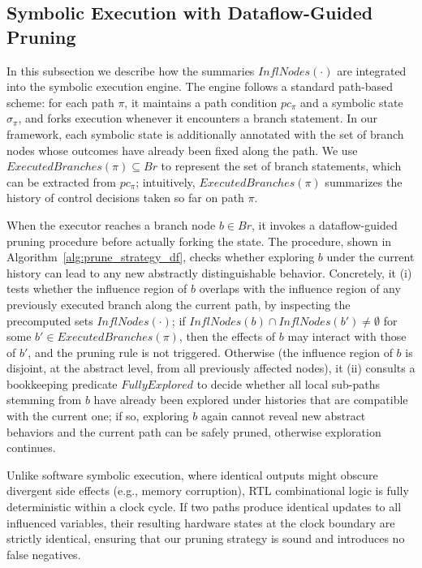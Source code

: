\documentclass[conference]{IEEEtran}
\begin{document}
\subsection{Symbolic Execution with Dataflow-Guided Pruning}
\label{subsec:symex-pruning}
In this subsection we describe how the summaries $InflNodes(\cdot)$ are integrated into the symbolic execution engine. The engine follows a standard path-based scheme: for each path $\pi$, it maintains a path condition $pc_\pi$ and a symbolic state $\sigma_\pi$, and forks execution whenever it encounters a branch statement. In our framework, each symbolic state is additionally annotated with the set of branch nodes whose outcomes have already been fixed along the path. We use $ExecutedBranches(\pi) \subseteq Br$ to represent the set of branch statements, which can be extracted from $pc_\pi$; intuitively, $ExecutedBranches(\pi)$ summarizes the history of control decisions taken so far on path $\pi$.

When the executor reaches a branch node $b \in Br$, it invokes a
dataflow-guided pruning procedure before actually forking the state.
The procedure, shown in Algorithm~\ref{alg:prune_strategy_df}, checks
whether exploring $b$ under the current history can lead to any new
abstractly distinguishable behavior. Concretely, it (i) tests whether
the influence region of $b$ overlaps with the influence region of any
previously executed branch along the current path, by inspecting the
precomputed sets $InflNodes(\cdot)$; if
$InflNodes(b) \cap InflNodes(b') \neq \emptyset$ for some
$b' \in ExecutedBranches(\pi)$, then the effects of $b$ may interact
with those of $b'$, and the pruning rule is not triggered. Otherwise
(the influence region of $b$ is disjoint, at the abstract level, from
all previously affected nodes), it (ii) consults a bookkeeping
predicate $\mathit{FullyExplored}$ to decide whether all local
sub-paths stemming from $b$ have already been explored under histories
that are compatible with the current one; if so, exploring $b$ again
cannot reveal new abstract behaviors and the current path can be safely
pruned, otherwise exploration continues.

Unlike software symbolic execution, where identical outputs might obscure divergent side effects (e.g., memory corruption), RTL combinational logic is fully deterministic within a clock cycle. If two paths produce identical updates to all influenced variables, their resulting hardware states at the clock boundary are strictly identical, ensuring that our pruning strategy is sound and introduces no false negatives.
\end{document}
